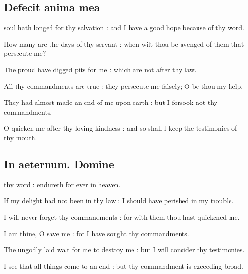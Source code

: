\subsection{Defecit anima mea}
 soul hath longed for thy salvation : and I have a good hope because of thy word.\par
{}
How many are the days of thy servant : when wilt thou be avenged of them that persecute me?\par
{}The proud have digged pits for me : which are not after thy law.\par
{}All thy commandments are true : they persecute me falsely; O be thou my help.\par
{}They had almost made an end of me upon earth : but I forsook not thy commandments.\par
{}O quicken me after thy loving-kindness : and so shall I keep the testimonies of thy mouth.\par

\subsection{In aeternum. Domine}
 thy word : endureth for ever in heaven.\par
{}
If my delight had not been in thy law : I should have perished in my trouble.\par
{}I will never forget thy commandments : for with them thou hast quickened me.\par
{}I am thine, O save me : for I have sought thy commandments.\par
{}The ungodly laid wait for me to destroy me : but I will consider thy testimonies.\par
{}I see that all things come to an end : but thy commandment is exceeding broad.\par

